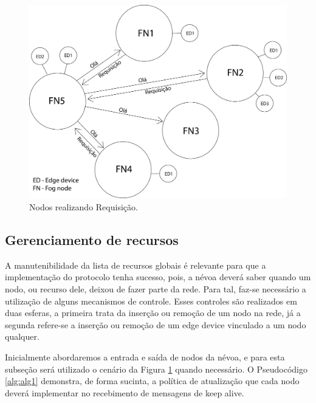 \begin{figure}[H]
    \centering\includegraphics[width=.8\textwidth]{fig6.png}
    \caption%
    {\label{fig:fig6} Nodos realizando Requisição.}
\end{figure}


\subsection{Gerenciamento de recursos}

A manutenibilidade da lista de recursos globais é relevante para que a implementação do protocolo tenha sucesso, pois, a névoa deverá saber quando um nodo, ou recurso dele, deixou de fazer parte da rede.
Para tal, faz-se necessário a utilização de alguns mecanismos de controle.
Esses controles são realizados em duas esferas, a primeira trata da inserção ou remoção de um nodo na rede,
já a segunda refere-se a inserção ou remoção de um edge device vinculado a um nodo qualquer.


Inicialmente abordaremos a entrada e saída de nodos da névoa, e para esta subseção será utilizado o cenário da Figura \ref{fig:fig6} quando necessário.
O Pseudocódigo \ref{alg:alg1} demonstra, de forma sucinta, a política de atualização que cada nodo deverá implementar no recebimento de mensagens de keep alive.


